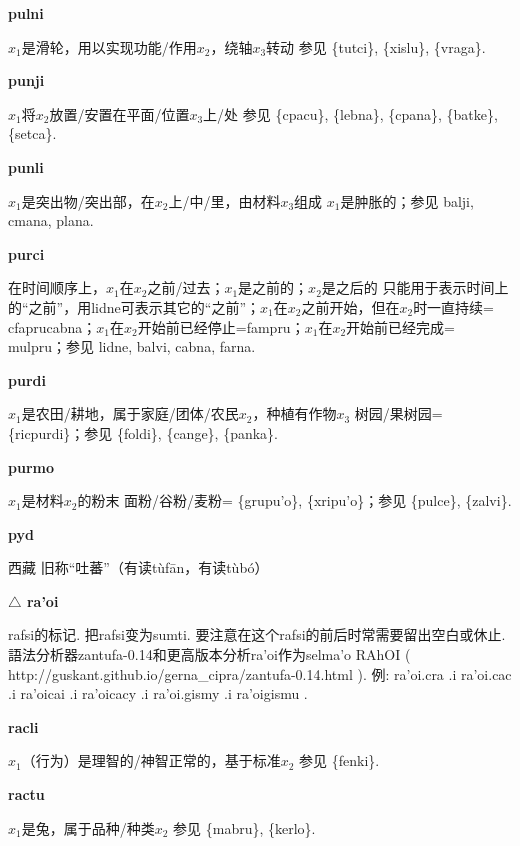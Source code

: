 \documentclass[notitlepage,twocolumn,a4paper,10pt]{book}
\begin{document}
{\sffamily\bfseries pulni} $x_1$是滑轮，用以实现功能\slash{}作用$x_2$，绕轴$x_3$转动 \textemdash{} 参见 \{tutci\}, \{xislu\}, \{vraga\}.

{\sffamily\bfseries punji}\enspace {\ttfamily\bfseries[puj     pu'i]}  $x_1$将$x_2$放置\slash{}安置在平面\slash{}位置$x_3$上\slash{}处 \textemdash{} 参见 \{cpacu\}, \{lebna\}, \{cpana\}, \{batke\}, \{setca\}.

{\sffamily\bfseries punli}\enspace {\ttfamily\bfseries[pul]}  $x_1$是突出物\slash{}突出部，在$x_2$上\slash{}中\slash{}里，由材料$x_3$组成 \textemdash{} $x_1$是肿胀的；参见 {balji}, {cmana}, {plana}.

{\sffamily\bfseries purci}  在时间顺序上，$x_1$在$x_2$之前\slash{}过去；$x_1$是之前的；$x_2$是之后的 \textemdash{} 只能用于表示时间上的“之前”，用{lidne}可表示其它的“之前”；$x_1$在$x_2$之前开始，但在$x_2$时一直持续= {cfaprucabna}；$x_1$在$x_2$开始前已经停止={fampru}；$x_1$在$x_2$开始前已经完成= {mulpru}；参见 {lidne}, {balvi}, {cabna}, {farna}.

{\sffamily\bfseries purdi}\enspace {\ttfamily\bfseries[pud]}  $x_1$是农田\slash{}耕地，属于家庭\slash{}团体\slash{}农民$x_2$，种植有作物$x_3$ \textemdash{} 树园\slash{}果树园= \{ricpurdi\}；参见 \{foldi\}, \{cange\}, \{panka\}.

{\sffamily\bfseries purmo}\enspace {\ttfamily\bfseries[pum     pu'o]}  $x_1$是材料$x_2$的粉末 \textemdash{} 面粉\slash{}谷粉\slash{}麦粉= \{grupu'o\}, \{xripu'o\}；参见 \{pulce\}, \{zalvi\}.

{\sffamily\bfseries pyd} 西藏 \textemdash{} 旧称“吐蕃”（有读tùfān，有读tùbó）

{\sffamily\bfseries $\triangle$ ra'oi}\enspace {\sffamily\bfseries[RAhOI]}  rafsi的标记. 把rafsi变为sumti. \textemdash{} 要注意在这个rafsi的前后时常需要留出空白或休止. 語法分析器zantufa-0.14和更高版本分析ra'oi作为selma'o RAhOI ( http:\slash{}\slash{}guskant.github.io\slash{}gerna\_cipra\slash{}zantufa-0.14.html ). 例: ra'oi.cra .i ra'oi.cac .i ra'oicai .i ra'oicacy .i ra'oi.gismy .i ra'oigismu .

{\sffamily\bfseries racli} $x_1$（行为）是理智的\slash{}神智正常的，基于标准$x_2$ \textemdash{} 参见 \{fenki\}.

{\sffamily\bfseries ractu} $x_1$是兔，属于品种\slash{}种类$x_2$ \textemdash{} 参见 \{mabru\}, \{kerlo\}.
\end{document}
